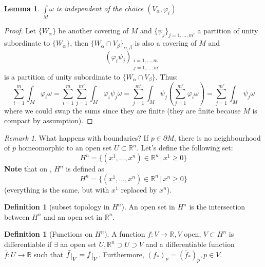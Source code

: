 \documentclass[a4paper,11pt,titlepage, article, oneside]{memoir}
\numberwithin{equation}{section}
\newtheorem{lemma}[theorem]{Lemma}
\theoremstyle{definition}
\newtheorem{definition}[theorem]{Definition}
\theoremstyle{remark}
\newtheorem{remark}[theorem]{Remark}
\newcommand{\rfield}{\mathbb{R}}
\newcommand{\restrict}[2]{{#1}\raisebox{-.5ex}{$|$}_{#2}}
\begin{document}
\begin{lemma}
  $\int\limits_{M} \omega$ is independent of the choice $(V_{\alpha}, \varphi_i)$
\end{lemma}
\begin{proof}
Let $\{ W_{\alpha} \}$ be another covering of $M$ and $\{\psi_j\}_{j=1, \ldots, m'}$ a partition of unity
 subordinate to $\{W_{\alpha}\}$, 
 then $\{W_{\alpha} \cap V_{\beta}\}_{\alpha, \beta}$ is also
  a covering of $M$ and 
  \[ \left(\varphi_i \psi_j \right)_{\substack{i=1, \ldots, m \\ j=1, \ldots, m'}}\]
  is a partition of unity subordinate to $\{W_{\alpha} \cap V_{\beta}\}$. Thus:
\[ \sum\limits_{i=1}^m \int_M \varphi_i \omega = \sum\limits_{i=1}^m \sum_{j=1}^{m'} \int_M \varphi_i \psi_j \omega = \sum\limits_{j=1}^{m'} \int_M \psi_j \left( \sum\limits_{j=1}^{m'} \varphi_i \omega \right) = \sum\limits_{j=1}^{m'} \int_M \psi_j \omega \]
where we could swap the sums since they are finite (they are finite because $M$ is compact by assumption).  
\end{proof}

\begin{remarkbox}\begin{remark}
  What happens with boundaries? If $p \in \partial M$, there is no neighbourhood of $p$ homeomorphic to an open set $U \subset \rfield^n$.
  Let's define the following set:
  $$H^n = \{ (x^1, \ldots, x^n) \in \rfield^n \, | \, x^1 \ge 0 \}$$
  \textbf{Note} that on , $H^n$ is defined as
  $$H^n = \{ (x^1, \ldots, x^n) \in \rfield^n \, | \, x^n \ge 0 \}$$
  (everything is the same, but with $x^1$ replaced by $x^n$).
\end{remark}\end{remarkbox}

\begin{definition}[subset topology in $H^n$]
  An open set in $H^n$ is the intersection between $H^n$ and an open set in $\rfield^n$.
\end{definition}

\begin{definition}[Functions on $H^n$]
  A function $f \colon V \rightarrow \rfield, V$ open, $V \subset H^n$ is differentiable if $\exists$ an open set $U, \rfield^n \supset U \supset V$ and a differentiable function
  $\bar f \colon U \rightarrow \rfield$ such that $\restrict{\bar f}{V} = \restrict{f}{V}$.
  Furthermore, $(f_*)_p = (\bar f_*)_p, p \in V$.
\end{definition}
\end{document}
